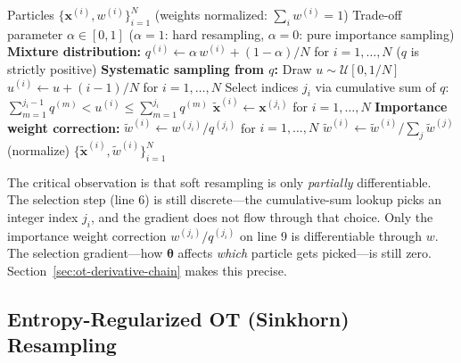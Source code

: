 \documentclass{article}
\renewcommand{\v}[1]{ \ensuremath{ {\mathbf{#1}} }}
\begin{document}
\begin{algorithm}[H]
\caption{Soft Resampling}
\begin{algorithmic}[1]
\REQUIRE Particles $\{\mathbf{x}^{(i)}, w^{(i)}\}_{i=1}^N$ (weights normalized: $\sum_i w^{(i)}=1$)
\REQUIRE Trade-off parameter $\alpha \in [0,1]$ ($\alpha=1$: hard resampling, $\alpha=0$: pure importance sampling)
\STATE \textbf{Mixture distribution:}
\STATE $q^{(i)} \leftarrow \alpha\, w^{(i)} + (1-\alpha)/N$ for $i=1,\ldots,N$ \hfill ($q$ is strictly positive)
\STATE \textbf{Systematic sampling from $q$:}
\STATE Draw $u \sim \mathcal{U}[0, 1/N]$
\STATE $u^{(i)} \leftarrow u + (i-1)/N$ for $i=1,\ldots,N$
\STATE Select indices $j_i$ via cumulative sum of $q$: $\sum_{m=1}^{j_i-1} q^{(m)} < u^{(i)} \leq \sum_{m=1}^{j_i} q^{(m)}$
\STATE $\tilde{\mathbf{x}}^{(i)} \leftarrow \mathbf{x}^{(j_i)}$ for $i=1,\ldots,N$
\STATE \textbf{Importance weight correction:}
\STATE $\tilde{w}^{(i)} \leftarrow w^{(j_i)} / q^{(j_i)}$ for $i=1,\ldots,N$
\STATE $\tilde{w}^{(i)} \leftarrow \tilde{w}^{(i)} / \sum_j \tilde{w}^{(j)}$ \hfill (normalize)
\RETURN $\{\tilde{\mathbf{x}}^{(i)}, \tilde{w}^{(i)}\}_{i=1}^N$
\end{algorithmic}
\end{algorithm}

The critical observation is that soft resampling is only \emph{partially} differentiable. The selection step (line 6) is still discrete---the cumulative-sum lookup picks an integer index $j_i$, and the gradient does not flow through that choice. Only the importance weight correction $w^{(j_i)} / q^{(j_i)}$ on line 9 is differentiable through $w$. The selection gradient---how $\v\theta$ affects \emph{which} particle gets picked---is still zero. Section~\ref{sec:ot-derivative-chain} makes this precise.

\subsection{Entropy-Regularized OT (Sinkhorn) Resampling}
\label{sec:entropic-ot}
\end{document}
